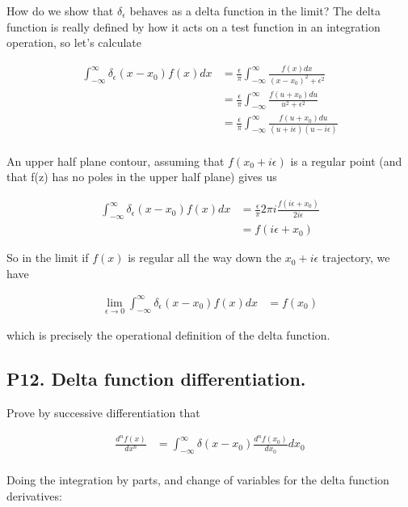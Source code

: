 \documentclass{article}
\newcommand{\IIinf}[0]{ \int_{-\infty}^\infty }
\begin{document}
How do we show that $\delta_\epsilon$ behaves as a delta function in the limit?  The delta function is really defined by how it
acts on a test function in an integration operation, so let's calculate 

\begin{align*}
\IIinf \delta_\epsilon(x - x_0) f(x) dx 
&=
\frac{\epsilon }{\pi} \IIinf \frac{f(x) dx}{(x-x_0)^2 + \epsilon^2} \\
&=
\frac{\epsilon }{\pi} \IIinf \frac{f(u + x_0) du}{u^2 + \epsilon^2} \\
&=
\frac{\epsilon }{\pi} \IIinf \frac{f(u + x_0) du}{(u + i \epsilon)(u - i \epsilon)} \\
\end{align*}

An upper half plane contour, assuming that $f(x_0 + i\epsilon)$ is a regular point (and that f(z) has no poles in the upper half plane) gives us

\begin{align*}
\IIinf \delta_\epsilon(x - x_0) f(x) dx 
&=
\frac{\epsilon }{\pi} 2 \pi i \frac{f(i \epsilon + x_0) }{2 i \epsilon} \\
&=
f(i \epsilon + x_0)
\end{align*}

So in the limit if $f(x)$ is regular all the way down the $x_0 + i\epsilon$ trajectory, we have

\begin{align*}
\lim_{\epsilon \rightarrow 0} \IIinf \delta_\epsilon(x - x_0) f(x) dx &= f(x_0)
\end{align*}

which is precisely the operational definition of the delta function.

\subsection{ P12. Delta function differentiation. }

Prove by successive differentiation that

\begin{align*}
\frac{d^n f(x)}{dx^n} 
&= \int_{-\infty}^{\infty} \delta(x - x_0) \frac{d^n f(x_0)}{dx_0} dx_0 \\
\end{align*}

Doing the integration by parts, and change of variables for the delta function derivatives:
\end{document}
